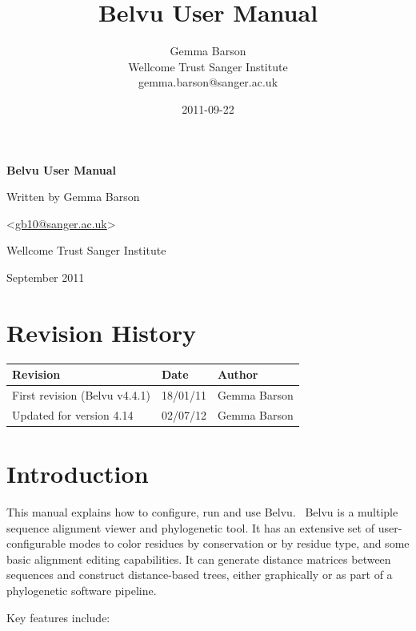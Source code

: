 \documentclass[letterpaper]{article}
\title{Belvu User Manual}
\author{Gemma Barson\\Wellcome Trust Sanger Institute\\gemma.barson@sanger.ac.uk}
\date{2011-09-22}
\begin{document}
\thispagestyle{FirstPage}
{\centering\sffamily\bfseries\color[rgb]{0.0,0.27058825,0.5254902}
\Huge\bf{Belvu User Manual}
\par}

\bigskip

{\centering
\large{Written by Gemma Barson}
\par}
{\centering
{\textless}\href{mailto:gb10@sanger.ac.uk}{gb10@sanger.ac.uk}{\textgreater}
\par}

\bigskip

{\centering
\large{Wellcome Trust Sanger Institute}
\par}
{ September 2011
\par}


\clearpage\section[Revision History]{Revision History}

\begin{center}
\tablehead{}
\begin{supertabular}{|m{8.073cm}|m{3.2849998cm}|m{3.282cm}|}
\hline
\bf Revision &
\bf Date &
\bf Author\\\hline
First revision (Belvu v4.4.1) &
18/01/11 &
Gemma Barson\\\hline
Updated for version 4.14 &
02/07/12 &
Gemma Barson\\\hline
\end{supertabular}
\end{center}

\clearpage
\tableofcontents

\clearpage\section[Introduction]{Introduction}
This manual explains how to configure, run and use Belvu. \ Belvu is a multiple sequence alignment viewer and phylogenetic tool. It has an extensive set of user-configurable modes to color residues by conservation or by residue type, and some basic alignment editing capabilities. It can generate distance matrices between sequences and construct distance-based trees, either graphically or as part of a phylogenetic software pipeline.

Key features include:
\end{document}
